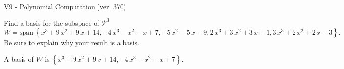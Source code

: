\begin{exercise}
  \begin{exerciseTitle}V9 - Polynomial Computation (ver. 370)\end{exerciseTitle}
  \begin{exerciseStatement}
    Find a basis for the subspace of \(\mathcal{P}^3\) 
\[W=\mathrm{span}\ \left\{x^{3} + 9 \, x^{2} + 9 \, x + 14 , -4 \, x^{3} - x^{2} - x + 7 , -5 \, x^{2} - 5 \, x - 9 , 2 \, x^{3} + 3 \, x^{2} + 3 \, x + 1 , 3 \, x^{3} + 2 \, x^{2} + 2 \, x - 3\right\}.\]
 Be sure to explain why your result is a basis.


  \end{exerciseStatement}
  \begin{exerciseAnswer}
   A basis of \(W\) is  \(\left\{x^{3} + 9 \, x^{2} + 9 \, x + 14 , -4 \, x^{3} - x^{2} - x + 7\right\}\).
  


  \end{exerciseAnswer}
\end{exercise}